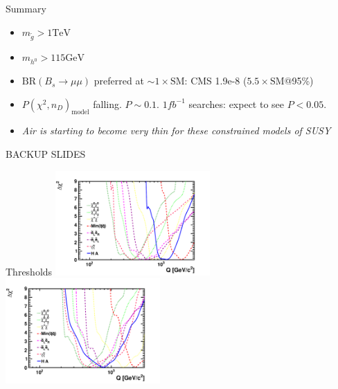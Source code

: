 \documentclass{beamer}
\begin{document}
\begin{frame}{Summary}
  \begin{itemize}
    \item $m_{\tilde{g}}> 1\textrm{TeV}$
    \item $m_{h^{0}}>115\textrm{GeV}$
    \item $\textrm{BR}\left(B_{s}\rightarrow\mu\mu\right)$ preferred at
    $\sim1\times\textrm{SM}$: CMS 1.9e-8 ($5.5\times\textrm{SM}$@95\%)
    \item $P\left(\chi^{2},n_{D}\right)_{\textrm{model}}$ falling.
    $P\sim0.1$.  $1fb^{-1}$ searches: expect to see $P<0.05$.
    \item \emph{Air is starting to become very thin for these constrained models of
    SUSY}
  \end{itemize}
\end{frame}

\begin{frame}{BACKUP SLIDES}
\end{frame}

\begin{frame}{Thresholds}
            \hfill\includegraphics[height=4cm]{thresh/cmssm.pdf}
            \includegraphics[height=4cm]{thresh/nuhm1.pdf}\hfill
\end{frame}
\end{document}
